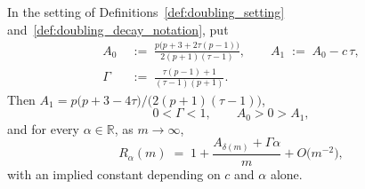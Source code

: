 \begin{lemma}\label{lem:doubling_expansion}
In the setting of Definitions~\ref{def:doubling_setting} and~\ref{def:doubling_decay_notation},
put
\begin{equation}\label{eq:doubling_AB}
\begin{aligned}
    A_0\;&:=\;\frac{p\bigl(p+3+2\tau(p-1)\bigr)}{2(p+1)(\tau-1)},\qquad
    A_1\;:=\;A_0-c\,\tau,\\
    \Gamma\;&:=\;\frac{\tau(p-1)+1}{(\tau-1)(p+1)} .
\end{aligned}
\end{equation}
Then $A_1=p\bigl(p+3-4\tau\bigr)\big/\bigl(2(p+1)(\tau-1)\bigr)$,
\begin{equation}\label{eq:doubling_signs}
    0<\Gamma<1,\qquad A_0>0>A_1 ,
\end{equation}
and for every $\alpha\in\mathbb R$, as $m\rightarrow\infty$,
\begin{equation}\label{eq:doubling_Rexp}
    R_\alpha(m)\;=\;1+\frac{A_{\delta(m)}+\Gamma\alpha}{m}+O\bigl(m^{-2}\bigr),
\end{equation}
with an implied constant depending on $c$ and $\alpha$ alone.
\end{lemma}

